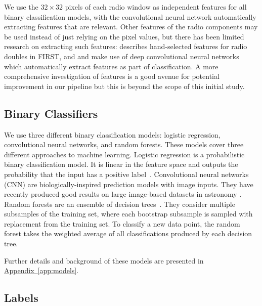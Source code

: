 \documentclass[fleqn,usenatbib,usedcolumn]{mnras}
\newcommand{\aref}[1]{\hyperref[#1]{Appendix~\ref{#1}}}
\begin{document}
    We use the $32 \times 32$ pixels of each radio window as independent
    features for all binary classification models, with the convolutional neural
    network automatically extracting features that are relevant. Other
    features of the radio components may be used instead of just relying on the pixel values,
    but there has been limited research on extracting such features:
    \citet{proctor06} describes hand-selected features for radio doubles in
    FIRST, and \citet{aniyan17cnn} and \citet{lukic18compact} make use of
    deep convolutional neural networks which automatically extract features as
    part of classification. A more comprehensive investigation of features is
    a good avenue for potential improvement in our pipeline but this is beyond
    the scope of this initial study.

  \subsection{Binary Classifiers}\label{sec:classifiers}

    We use three different binary classification models: logistic regression,
    convolutional neural networks, and random forests. These models cover
    three different approaches to machine learning. Logistic regression is a
    probabilistic binary classification model. It is linear in the feature
    space and outputs the probability that the input has a positive
    label~\citep[Chap. 4]{bishop06ml}. Convolutional neural networks (CNN) are
    biologically-inspired prediction models with image inputs.
    They have recently produced good results on large image-based datasets in
    astronomy \citep[e.g.]{lukic18compact, dieleman15cnn}. Random
    forests are an ensemble of decision trees~\citep{breiman01random-forest}.
    They consider multiple subsamples of the training set, where each
    bootstrap subsample is sampled with replacement from the training set. To
    classify a new data point, the random forest takes the weighted average of
    all classifications produced by each decision tree.

    Further details and background of these models are presented in \aref{app:models}.

  \subsection{Labels}\label{sec:labels}
\end{document}
